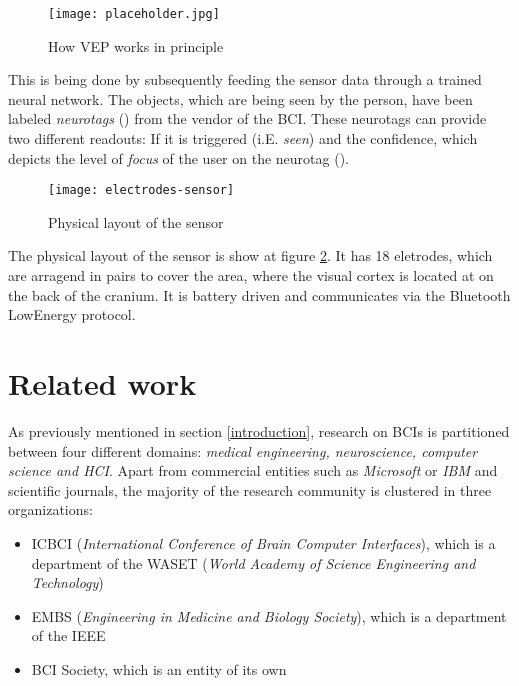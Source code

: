             \begin{figure}[h]     %
                \centering
                \texttt{[image: placeholder.jpg]} 
                \caption{How VEP works in principle }\label{vep-principle}
            \end{figure}            
            
            This is being done by subsequently feeding the sensor data through a trained neural network. The objects, which are being seen by the person, have been labeled \textit{neurotags} (\cite{NextMind.23112020}) from the vendor of the BCI. These neurotags can provide two different readouts: If it is triggered (i.E. \textit{seen}) and the confidence, which depicts the level of \textit{focus} of the user on the neurotag (\cite{NextMind.18112020}).
            
            \begin{figure}[h]     %
                \centering
                \texttt{[image: electrodes-sensor]} 
                \caption{Physical layout of the sensor}\label{electrodes-sensor}
            \end{figure}
            
            The physical layout of the sensor is show at figure \ref*{electrodes-sensor}. It has 18 eletrodes, which are arragend in pairs to cover the area, where the visual cortex is located at on the back of the cranium. It is battery driven and communicates via the Bluetooth LowEnergy protocol.

        \section{Related work}\label{related-work}

            As previously mentioned in section \ref*{introduction}, research on BCIs is partitioned between four different domains: \textit{medical engineering, neuroscience, computer science and HCI}. Apart from commercial entities such as \textit{Microsoft} or \textit{IBM} and scientific journals, the majority of the research community is clustered in three organizations: 

            \begin{itemize}
                \item ICBCI (\textit{International Conference of Brain Computer Interfaces}), which is a department of the WASET (\textit{World Academy of Science Engineering and Technology})
                \item EMBS (\textit{Engineering in Medicine and Biology Society}), which is a department of the IEEE
                \item BCI Society, which is an entity of its own
            \end{itemize}

